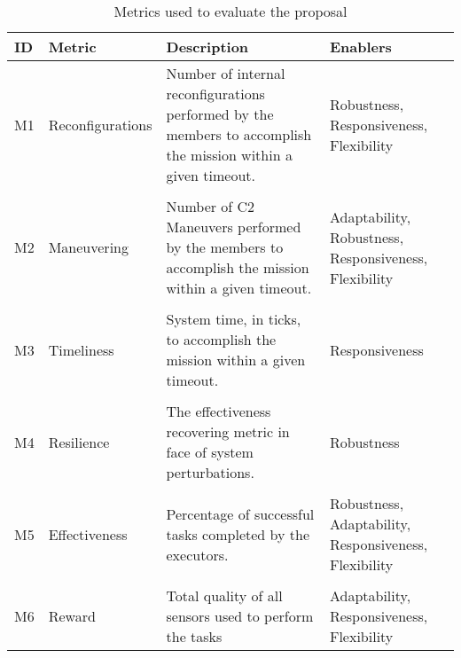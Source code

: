 \begin{table}[ht!]
	\small
	\fontsize{10}{10}\selectfont
	\centering
	\caption{Metrics used to evaluate the proposal}
	\label{table:metrics}
	
	\begin{tabularx}{\textwidth}{llXX}
	\hline
		\textbf{ID}
		& \textbf{Metric}
		& \textbf{Description}
		& \textbf{Enablers} \\ [1ex]
	\hline	
	
	M1 & Reconfigurations & Number of internal reconfigurations performed by the members to accomplish the mission within a given timeout. & Robustness, Responsiveness, Flexibility
	\\[1ex] \\
	
	M2 & Maneuvering & Number of C2 Maneuvers performed by the members to accomplish the mission within a given timeout. & Adaptability, Robustness, Responsiveness, Flexibility
	\\[1ex] \\
	
	M3 & Timeliness & System time, in ticks, to accomplish the mission within a given timeout. & Responsiveness
	\\[1ex] \\
	
	M4 & Resilience & The effectiveness recovering metric in face of system perturbations. & Robustness
	\\[1ex] \\
	
	M5 & Effectiveness &  Percentage of successful tasks completed by the executors. & Robustness, Adaptability, Responsiveness, Flexibility
	\\[1ex] \\
	
	M6 & Reward & Total quality of all sensors used to perform the tasks & Adaptability, Responsiveness, Flexibility
	\\[1ex]
	\hline
	\end{tabularx}
\end{table} 